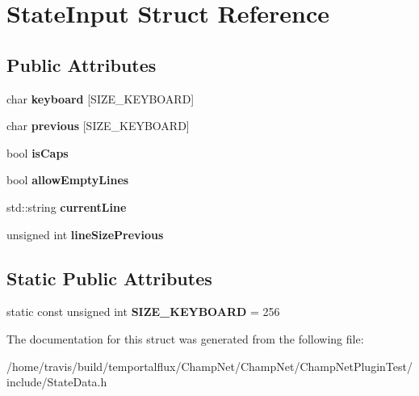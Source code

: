 \hypertarget{struct_state_input}{\section{State\-Input Struct Reference}
\label{struct_state_input}
}
\subsection*{Public Attributes}
\begin{DoxyCompactItemize}
\item 
\hypertarget{struct_state_input_a48ab250bd3e991a9de2c5ddb25f825e4}{char {\bfseries keyboard} \mbox{[}S\-I\-Z\-E\-\_\-\-K\-E\-Y\-B\-O\-A\-R\-D\mbox{]}}\label{struct_state_input_a48ab250bd3e991a9de2c5ddb25f825e4}

\item 
\hypertarget{struct_state_input_a711e607cf2c158c933b80bfc8caa036a}{char {\bfseries previous} \mbox{[}S\-I\-Z\-E\-\_\-\-K\-E\-Y\-B\-O\-A\-R\-D\mbox{]}}\label{struct_state_input_a711e607cf2c158c933b80bfc8caa036a}

\item 
\hypertarget{struct_state_input_a74ffea978c21525eef29d3612f8ab88f}{bool {\bfseries is\-Caps}}\label{struct_state_input_a74ffea978c21525eef29d3612f8ab88f}

\item 
\hypertarget{struct_state_input_a144b051f8d304e3fb9f8d69e4fddaa5d}{bool {\bfseries allow\-Empty\-Lines}}\label{struct_state_input_a144b051f8d304e3fb9f8d69e4fddaa5d}

\item 
\hypertarget{struct_state_input_a5ce1360c9195f7dfe700e9398b9c8e7b}{std\-::string {\bfseries current\-Line}}\label{struct_state_input_a5ce1360c9195f7dfe700e9398b9c8e7b}

\item 
\hypertarget{struct_state_input_ab6d707a36eabe343d0b46838773da8f9}{unsigned int {\bfseries line\-Size\-Previous}}\label{struct_state_input_ab6d707a36eabe343d0b46838773da8f9}

\end{DoxyCompactItemize}
\subsection*{Static Public Attributes}
\begin{DoxyCompactItemize}
\item 
\hypertarget{struct_state_input_acc91adb5a30e828f5fd4be0228a09040}{static const unsigned int {\bfseries S\-I\-Z\-E\-\_\-\-K\-E\-Y\-B\-O\-A\-R\-D} = 256}\label{struct_state_input_acc91adb5a30e828f5fd4be0228a09040}

\end{DoxyCompactItemize}


The documentation for this struct was generated from the following file\-:\begin{DoxyCompactItemize}
\item 
/home/travis/build/temportalflux/\-Champ\-Net/\-Champ\-Net/\-Champ\-Net\-Plugin\-Test/include/State\-Data.\-h\end{DoxyCompactItemize}
